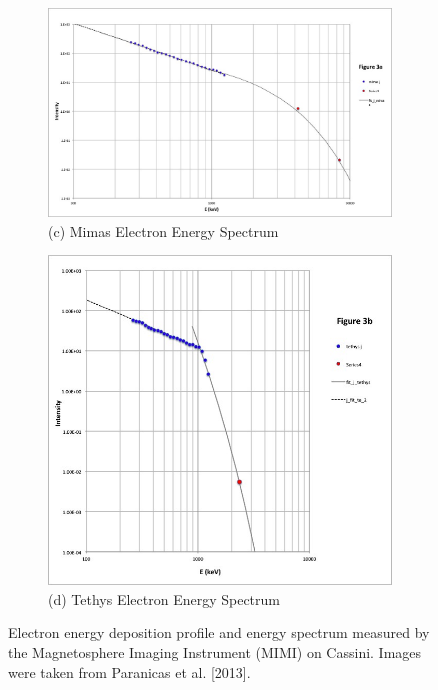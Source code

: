 \documentclass[11pt]{article} %
\begin{document}
\begin{figure}[ht]
\begin{subfigure}[h]{0.5\textwidth}
			\includegraphics[width=\textwidth]{Paranicas_MimasEnergySpectrum.png}
			\caption{(c) Mimas Electron Energy Spectrum}
		\end{subfigure}
		\begin{subfigure}[h]{0.5\textwidth}
			\includegraphics[width=\textwidth]{Paranicas_TethysEnergySpectrum.png}
			\caption{(d) Tethys Electron Energy Spectrum}
		\end{subfigure}
	\caption{Electron energy deposition profile and energy spectrum measured by the Magnetosphere Imaging Instrument (MIMI) on Cassini. Images were taken from Paranicas et al. [2013].}
	

\end{figure}
\end{document}
